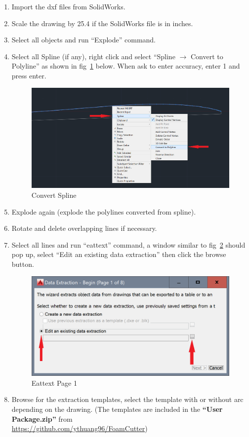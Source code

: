 \documentclass[titlepage,12pt,letter]{report}
\numberwithin{equation}{chapter}
\begin{document}
\begin{enumerate}[itemsep = 5pt,topsep=0pt]
	\item Import the dxf files from SolidWorks.
	\item Scale the drawing by 25.4 if the SolidWorks file is in inches.
	\item Select all objects and run ``Explode'' command.
	\item Select all Spline (if any), right click and select ``Spline $\rightarrow$ Convert to Polyline'' as shown in fig~\ref{fig:cad3} below. When ask to enter accuracy, enter 1 and press enter.
	\begin{figure} [H]
		\includegraphics[width = 0.9\linewidth]{./Figures/general_shape/cad3.png}
		\caption{Convert Spline}
		\label{fig:cad3}
	\end{figure}
	\item Explode again (explode the polylines converted from spline).
	\item Rotate and delete overlapping lines if necessary.
	\item Select all lines and run ``eattext'' command, a window similar to fig~\ref{fig:cad4} should pop up, select ``Edit an existing data extraction'' then click the browse button.
	\begin{figure} [H]
		\includegraphics[width = 0.6\linewidth]{./Figures/general_shape/cad4.png}
		\caption{Eattext Page 1}
		\label{fig:cad4}
	\end{figure}
	\item Browse for the extraction templates, select the template with or without arc depending on the drawing. (The templates are included in the \textbf{``User Package.zip''} from \\ \href{https://github.com/ythuang96/FoamCutter}{https://github.com/ythuang96/FoamCutter})

\end{enumerate}
\end{document}
